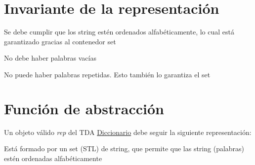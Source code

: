 \hypertarget{repDiccionario_invDiccionario}{}\section{Invariante de la representación}\label{repDiccionario_invDiccionario}

\begin{DoxyItemize}
\item Se debe cumplir que los string estén ordenados alfabéticamente, lo cual está garantizado gracias al contenedor set
\item No debe haber palabras vacías
\item No puede haber palabras repetidas. Esto también lo garantiza el set 
\end{DoxyItemize}\hypertarget{repDiccionario_faDiccionario}{}\section{Función de abstracción}\label{repDiccionario_faDiccionario}
Un objeto válido {\itshape rep} del T\+DA \hyperlink{classDiccionario}{Diccionario} debe seguir la siguiente representación\+:
\begin{DoxyItemize}
\item Está formado por un set (S\+TL) de string, que permite que las string (palabras) estén ordenadas alfabéticamente 
\end{DoxyItemize}